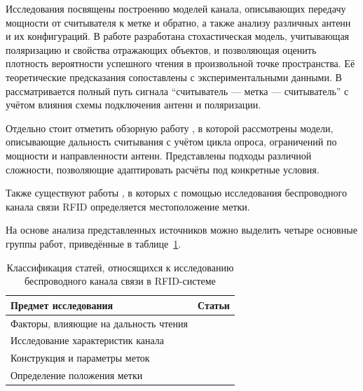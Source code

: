 \documentclass[12pt]{article}
\theoremstyle{definition}
\begin{document}
Исследования \cite{Griffin2007, Griffin2009, Trotter2009, Hasan2011, Kaifas2024} посвящены построению моделей канала, описывающих передачу мощности от считывателя к метке и обратно, а также анализу различных антенн и их конфигураций. В работе \cite{Dimitriou2014} разработана стохастическая модель, учитывающая поляризацию и свойства отражающих объектов, и позволяющая оценить плотность вероятности успешного чтения в произвольной точке пространства. Её теоретические предсказания сопоставлены с экспериментальными данными. В \cite{Nikitin2008} рассматривается полный путь сигнала “считыватель — метка — считыватель” с учётом влияния схемы подключения антенн и поляризации.

Отдельно стоит отметить обзорную работу \cite{Marrocco}, в которой рассмотрены модели, описывающие дальность считывания с учётом цикла опроса, ограничений по мощности и направленности антенн. Представлены подходы различной сложности, позволяющие адаптировать расчёты под конкретные условия.

Также существуют работы \cite{Nikitin2010, Xie2025}, в которых с помощью исследования беспроводного канала связи RFID определяется местоположение метки.

На основе анализа представленных источников можно выделить четыре основные группы работ, приведённые в таблице~\ref{table:channel}.

\begin{table}[h]
\begin{tabular}{|l|l|}
\hline
Предмет исследования                  & Статьи                                                                                                                                    \\ \hline
Факторы, влияющие на дальность чтения & \cite{Nikitin2006, Nikitin2009, Nikitin2008}                                                                                                    \\ \hline
Исследование характеристик канала                   & \cite{Nikitin2006b, Marrocco, Banerjee2007, Banerjee2008, Griffin2007, Griffin2009, Trotter2009, Hasan2011, Dimitriou2014, Alhassoun2019, ElAbsi2023, Padmal2024, Kaifas2024}                                                             \\ \hline
Конструкция и параметры меток         & \cite{Rao2008, MarrocMarroccoG, Mayer2007, Nikitin2012, Nikitin2009, Rocha2024, Bendavid2024} \\ \hline
Определение положения метки              & \cite{Nikitin2010, Xie2025}                                                                                                   \\ \hline
\end{tabular}\caption{Классификация статей, относящихся к исследованию беспроводного канала связи в RFID-системе}\label{table:channel}
\end{table}
\end{document}
